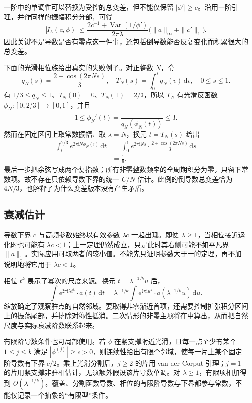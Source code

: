 一阶中的单调性可以替换为受控的总变差，但不能仅保留 \(|\phi'|\geq c\)。沿用一阶引理，并作同样的振幅积分分部，可得
\[
 |I_\lambda(a,\phi)|
 \leq \frac{2c^{-1}+\operatorname{Var}(1/\phi')}{2\pi\lambda}
       \bigl(\|a\|_\infty+\|a'\|_1\bigr).
\]
因此关键不是导数是否有零点这一件事，还包括倒导数能否反复变化而积累很大的总变差。

\ProseParagraphBreak

下面的光滑相位族给出真实的失败例子。对正整数 \(N\)，令
\[
 q_N(s)=\frac{2+\cos(2\pi Ns)}3,
 \quad
 T_N(s)=\int_0^s q_N(v)\,\mathrm dv,
 \quad 0\leq s\leq1.
\]
有 \(1/3\leq q_N\leq1\)、\(T_N(0)=0\)、\(T_N(1)=2/3\)，所以 \(T_N\) 有光滑反函数
\(\phi_N:[0,2/3]\to[0,1]\)，并且
\[
 1\leq\phi_N'(t)
 =\frac1{q_N(\phi_N(t))}\leq3.
\]
然而在固定区间上取常数振幅、取 \(\lambda=N\)，换元 \(t=T_N(s)\) 给出
\[
 \begin{aligned}
 \int_0^{2/3}e^{2\pi\mathrm iN\phi_N(t)}\,\mathrm dt
 &=\int_0^1e^{2\pi\mathrm iNs}\cdot
                  \frac{2+\cos(2\pi Ns)}3\,\mathrm ds\\
 &=\frac16.
 \end{aligned}
\]
最后一步把余弦写成两个复指数；所有非零整数频率的全周期积分为零，只留下常数项。故不存在只依赖导数下界的统一 \(C/N\) 估计。此例的倒导数总变差恰为 \(4N/3\)，也解释了为什么变差版本没有产生矛盾。

\subsection{衰减估计}
\label{b2:subsec:210104}

导数下界 \(c\) 与高频参数始终以有效参数 \(\lambda c\) 一起出现。即使 \(\lambda\geq1\)，当相位接近退化时也可能有 \(\lambda c<1\)；上一定理仍然成立，只是此时其右侧可能不如平凡界 \(\|a\|_1\)。实际应用可取两者的较小值。不能先只证明参数大于一的定理，再不加说明地将它用于 \(\lambda c<1\)。

\ProseParagraphBreak

相位 \(t^k\) 展示了幂次的尺度来源。换元 \(t=\lambda^{-1/k}u\) 后，
\[
 \int e^{2\pi\mathrm i\lambda t^k}\cdot a(t)\,\mathrm dt
 =\lambda^{-1/k}
   \int e^{2\pi\mathrm i u^k}\cdot a(\lambda^{-1/k}u)\,\mathrm du.
\]
缩放确定了观察驻点的自然邻域。要取得非零渐近首项，还需要控制扩张积分区间上的振荡尾部，并排除对称性抵消。二次情形的非零主项将在中算出，从而把自然尺度与实际衰减阶数联系起来。

\ProseParagraphBreak

有限阶导数条件也可局部使用。若 \(\phi\) 在紧支撑附近光滑，且每一点至少有某个 \(1\leq j\leq k\) 满足 \(|\phi^{(j)}|\geq c>0\)，则连续性给出有限个邻域，使每一片上某个固定阶导数有下界 \(c/2\)。乘上光滑分割后，\(j\geq2\) 的片用 van der Corput 引理；\(j=1\) 的片用紧支撑非驻相估计，无须额外假设该片导数单调。对 \(\lambda\geq1\)，有限项相加得到 \(O(\lambda^{-1/k})\)。覆盖、分割函数导数、相位的有限阶导数与下界都参与常数，不能仅记录一个抽象的“有限型”条件。

